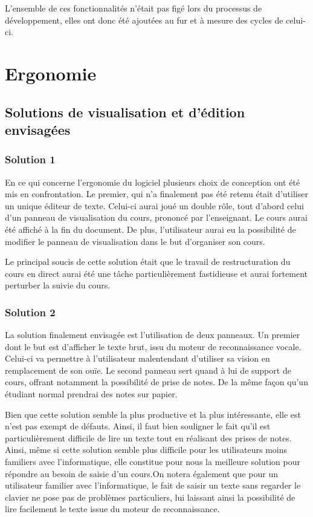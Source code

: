 L'ensemble de ces fonctionnalités n'était pas figé lors du processus de développement, elles ont donc été ajoutées au fur et à mesure des cycles de celui-ci.

\section{Ergonomie}

\subsection{Solutions de visualisation et d'édition envisagées}

\subsubsection{Solution 1}

En ce qui concerne l'ergonomie du logiciel plusieurs choix de conception ont été mis en confrontation. Le premier, qui n'a finalement pas été retenu était d'utiliser un unique éditeur de texte. Celui-ci aurai joué un  double rôle, tout d'abord celui d'un panneau de visualisation du cours, prononcé par l'enseignant. Le cours aurai été affiché à la fin du document. De plus, l'utilisateur aurai eu la possibilité de modifier le panneau de visualisation dans le but d'organiser son  cours.

Le principal soucis de cette solution était que le travail de restructuration du cours en direct aurai été une tâche particulièrement fastidieuse et aurai fortement perturber la suivie du cours.


\subsubsection{Solution 2}

La solution finalement envisagée est l'utilisation de deux panneaux. Un premier dont le but est d'afficher le texte brut, issu du moteur de reconnaissance vocale. Celui-ci  va permettre à l'utilisateur malentendant d'utiliser sa  vision en remplacement de son ouïe. Le second panneau sert quand à lui de support de cours, offrant notamment la possibilité de prise de notes. De la même façon qu'un étudiant normal prendrai des notes sur papier.

Bien que cette solution semble la plus productive et la plus intéressante, elle est n'est pas exempt de défauts. Ainsi, il faut bien souligner le fait qu'il est particulièrement difficile de lire un texte tout en réalisant des prises de notes. Ainsi, même si cette solution semble plus difficile pour les utilisateurs moins familiers avec l'informatique, elle constitue pour nous la meilleure solution pour répondre au besoin de saisie d'un cours.On notera également que pour un utilisateur familier avec l'informatique, le fait de saisir un texte sans regarder le clavier ne pose pas de problèmes particuliers, lui laissant ainsi la possibilité de lire facilement le texte issue du moteur de reconnaissance.


